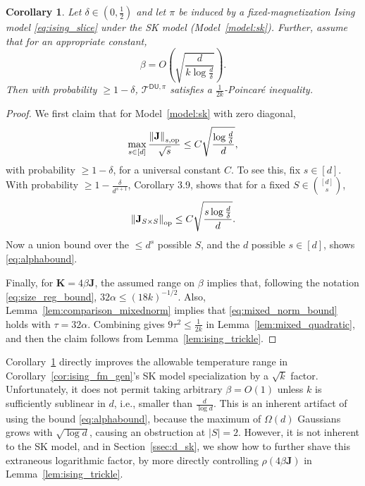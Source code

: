 \documentclass[11pt]{article}
\newtheorem{corollary}{Corollary}
\newcommand{\normop}[1]{\left\lVert#1\right\rVert_{\textup{op}}}
\newcommand{\half}{\frac{1}{2}}
\newcommand{\1}{\mathbf{1}}
\newcommand{\0}{\mathbf{0}}
\newcommand{\Par}[1]{\left(#1\right)}
\newcommand{\mj}{{\mathbf{J}}}
\newcommand{\mk}{{\mathbf{K}}}
\newcommand{\normkop}[2]{{\left\lVert#1\right\rVert_{#2, \textup{op}}}}
\newcommand{\calT}{{\mathcal{T}}}
\newcommand{\TDU}[1]{\calT^{\mathsf{DU}, #1}}
\begin{document}
\begin{corollary}\label{cor:near_proportional_sk}
Let $\delta \in (0, \half)$ and let $\pi$ be induced by a fixed-magnetization Ising model \eqref{eq:ising_slice} under the SK model (Model~\ref{model:sk}). Further, assume that for an appropriate constant,
\[\beta = O\Par{\sqrt{\frac{d}{k\log \frac d \delta}}}.\]
Then with probability $\ge 1 - \delta$, $\TDU{\pi}$ satisfies a $\frac 1 {2k}$-Poincar\'e inequality.
\end{corollary}
\begin{proof}
We first claim that for Model~\ref{model:sk} with zero diagonal,
\begin{equation}\label{eq:alphabound}\max_{s \in [d]} \frac{\normkop{\mj}{s}}{\sqrt{s}} \le C\sqrt{\frac{\log \frac d \delta}{d}},\end{equation}
with probability $\ge 1 - \delta$, for a universal constant $C$.
To see this, fix $s \in [d]$. With probability $\ge 1 - \frac \delta {d^{s + 1}}$,  Corollary 3.9, \cite{BandeiraVH16} shows that for a fixed $S \in \binom{[d]}{s}$,
\begin{equation}\label{eq:set_size_opnorm}\normop{\mj_{S \times S}} \le C\sqrt{\frac{s\log \frac d \delta}{d}}.\end{equation}
Now a union bound over the $\le d^{s}$ possible $S$, and the $d$ possible $s \in [d]$, shows \eqref{eq:alphabound}. 

Finally, for $\mk = 4\beta\mj$, the assumed range on $\beta$ implies that, following the notation \eqref{eq:size_reg_bound}, $32\alpha \le (18k)^{-1/2}$. Also, Lemma~\ref{lem:comparison_mixednorm} implies that \eqref{eq:mixed_norm_bound} holds with $\tau = 32\alpha$. Combining gives $9\tau^2 \le \frac 1 {2k}$ in Lemma~\ref{lem:mixed_quadratic}, and then the claim follows from Lemma~\ref{lem:ising_trickle}.
\end{proof}

Corollary~\ref{cor:near_proportional_sk} directly improves the allowable temperature range in Corollary~\ref{cor:ising_fm_gen}'s SK model specialization by a $\sqrt{k}$ factor. Unfortunately, it does not permit taking arbitrary $\beta = O(1)$ unless $k$ is sufficiently sublinear in $d$, i.e., smaller than $\frac d {\log d}$. This is an inherent artifact of using the bound \eqref{eq:alphabound}, because the maximum of $\Omega(d)$ Gaussians grows with $\sqrt{\log d}$, causing an obstruction at $|S| = 2$. However, it is not inherent to the SK model, and in Section~\ref{ssec:d_sk}, we show how to further shave this extraneous logarithmic factor, by more directly controlling $\rho(4\beta\mj)$ in Lemma~\ref{lem:ising_trickle}.
\end{document}
